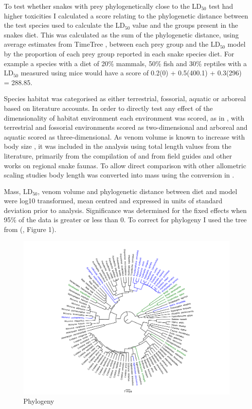 To test whether snakes with prey phylogenetically close to the LD$_{50}$ test had higher toxicities I calculated a score relating to the phylogenetic distance between the test species used to calculate the LD$_{50}$ value and the groups present in the snakes diet. This was calculated as the sum of the phylogenetic distance, using average estimates from TimeTree \citep{hedges2006timetree}, between each prey group and the LD$_{50}$ model by the proportion of each prey group reported in each snake species diet. For example a species with a diet of 20\% mammals, 50\% fish and 30\% reptiles with a LD$_{50}$ measured using mice would have a score of 0.2\*(0) + 0.5\*(400.1) + 0.3\*(296) = 288.85.


Species habitat was categorised as either terrestrial, fossorial, aquatic or arboreal based on literature accounts. In order to directly test any effect of the dimensionality of habitat environment each environment was scored, as in \citep{pawar2012dimensionality}, with terrestrial and fossorial environments scored as two-dimensional and arboreal and aquatic scored as three-dimensional.
As venom volume is known to increase with body size \citep{mirtschin2002influences}, it was included in the analysis using total length values from the literature, primarily from the compilation of \citep{boback2003empirical} and from field guides and other works on regional snake faunas. To allow direct comparison with other allometric scaling studies body length was converted into mass using the conversion in \citep{boback2003empirical}. 


Mass, LD$_{50}$, venom volume and phylogenetic distance between diet and model were log10 transformed, mean centred and expressed in units of standard deviation prior to analysis. Significance was determined for the fixed effects when 95\% of the data is greater or less than 0. To correct for phylogeny I used the tree from (\cite{pyron2014early}, Figure 1). 


\begin{figure}[h]
  \centering
  \includegraphics[width=.95\textwidth]{ch4-snakes/fig1_snake_phylo.pdf}%
  \caption[Figure 1.]{Phylogeny}
  \label{fig:Figure 1.}
\end{figure}


